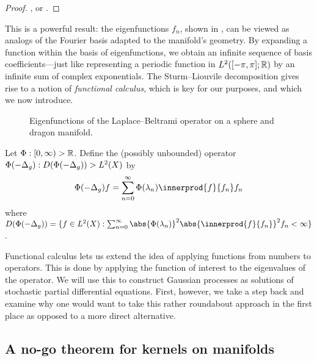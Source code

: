 \documentclass[11pt]{book}
\begin{document}
\begin{proof}
\textcite[139]{chavel84}, or \textcite[Theorem 44]{canzani13}.
\end{proof}

This is a powerful result: the eigenfunctions $f_n$, shown in , can be viewed as analogs of the Fourier basis adapted to the manifold's geometry.
By expanding a function within the basis of eigenfunctions, we obtain an infinite sequence of basis coefficients---just like representing a periodic function in $L^2([-\pi,\pi];\mathbb{R})$ by an infinite sum of complex exponentials.
The Sturm--Liouvile decomposition gives rise to a notion of \emph{functional calculus}, which is key for our purposes, and which we now introduce.


\begin{figure}
\tikzset{external/export next=false}
\caption[Laplace--Beltrami eigenfunctions: sphere and dragon manifold]{Eigenfunctions of the Laplace--Beltrami operator on a sphere and dragon manifold.}
\label{fig:eig-s2-dr}
\end{figure}

\begin{definition}
Let $\Phi : [0,\infty) \-> \mathbb{R}$. 
Define the (possibly unbounded) operator $\Phi(-\Delta_g) : D(\Phi(-\Delta_g)) \-> L^2(X)$ by
\[
\Phi(-\lap_g) f = \sum_{n=0}^\infty \Phi(\lambda_n) \innerprod{f}{f_n} f_n
\]
where $D(\Phi(-\lap_g)) = \{f \in L^2(X) : \sum_{n=0}^\infty \abs{\Phi(\lambda_n)}^2 \abs{\innerprod{f}{f_n}}^2 f_n < \infty\}$.
\end{definition}

Functional calculus lets us extend the idea of applying functions from numbers to operators.
This is done by applying the function of interest to the eigenvalues of the operator.
We will use this to construct Gaussian processes as solutions of stochastic partial differential equations.
First, however, we take a step back and examine why one would want to take this rather roundabout approach in the first place as opposed to a more direct alternative.

\subsection{A no-go theorem for kernels on manifolds}
\end{document}

